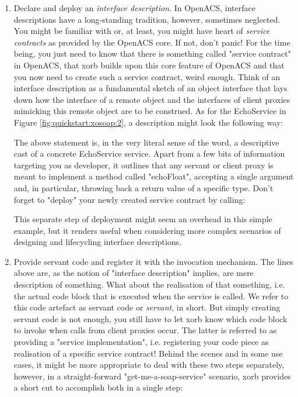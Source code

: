 \begin{enumerate}
\item Declare and deploy an \emph{interface description}. In OpenACS, interface descriptions have a long-standing tradition, however, sometimes neglected. You might be familiar with or, at least, you might have heart of \emph{service contracts} as provided by the OpenACS core. If not, don't panic! For the time being, you just need to know that there is something called "service contract" in OpenACS, that xorb builds upon this core feature of OpenACS and that you now need to create such a service contract, weird enough. Think of an interface description as a fundamental sketch of an object interface that lays down how the interface of a remote object and the interfaces of client proxies mimicking this remote object are to be construed. As for the EchoService in Figure \ref{fig:quickstart:xosoap:2}, a description might look the following way:
\lstset{breaklines=true,numbers=left,basicstyle=\footnotesize,frame=single}

The above statement is, in the very literal sense of the word, a descriptive cast of a concrete EchoService service. Apart from a few bits of information targeting you as developer, it outlines that any servant or client proxy is meant to implement a method called "echoFloat", accepting a single argument and, in particular, throwing back a return value of a specific type. Don't forget to "deploy" your newly created service contract by calling:

This separate step of deployment might seem an overhead in this simple example, but it renders useful when considering more complex scenarios of designing and lifecycling interface descriptions.
\item Provide servant code and register it with the invocation mechanism. The lines above are, as the notion of "interface description" implies, are mere description of something. What about the realisation of that something, i.e. the actual code block that is executed when the service is called. We refer to this code artefact as servant code or \emph{servant}, in short. But simply creating servant code is not enough, you still have to let xorb know which code block to invoke when calls from client proxies occur. The latter is referred to as providing a "service implementation", i.e. registering your code piece as realisation of a specific service contract! Behind the scenes and in some use cases, it might be more appropriate to deal with these two steps separately, however, in a straight-forward "get-me-a-soap-service" scenario, xorb provides a short cut to accomplish both in a single step:

\end{enumerate}
